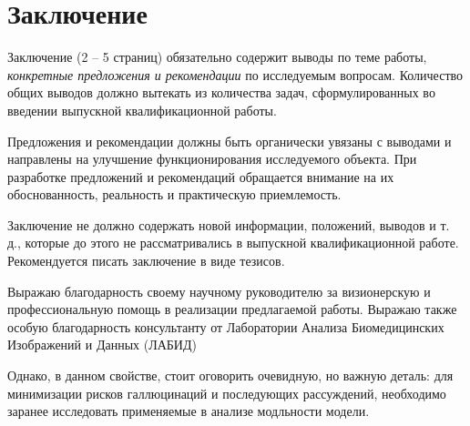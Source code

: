 \chapter*{Заключение} \label{ch-conclusion}

Заключение (2 -- 5 страниц) обязательно содержит выводы по теме работы, \textit{конкретные
предложения и рекомендации} по исследуемым вопросам. Количество общих выводов
должно вытекать из количества задач, сформулированных во введении выпускной
квалификационной работы.

Предложения и рекомендации должны быть органически увязаны с выводами
и направлены на улучшение функционирования исследуемого объекта. При разработке
предложений и рекомендаций обращается внимание на их обоснованность,
реальность и практическую приемлемость.

Заключение не должно содержать новой информации, положений, выводов и
т. д., которые до этого не рассматривались в выпускной квалификационной работе.
Рекомендуется писать заключение в виде тезисов.

Выражаю благодарность своему научному руководителю за визионерскую и профессиональную помощь
в реализации предлагаемой работы. Выражаю также особую благодарность консультанту от 
Лаборатории Анализа Биомедицинских Изображений и Данных (ЛАБИД)

Однако, в данном свойстве, стоит оговорить очевидную, но важную деталь:
для минимизации рисков галлюцинаций и последующих рассуждений, необходимо заранее исследовать применяемые 
в анализе модльности модели.

